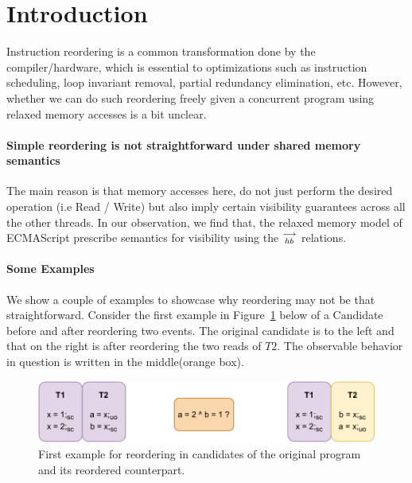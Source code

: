 
\section{Introduction}
    Instruction reordering is a common transformation done by the compiler/hardware, which is essential to optimizations such as instruction scheduling, loop invariant removal, partial redundancy elimination, etc. 
    However, whether we can do such reordering freely given a concurrent program using relaxed memory accesses is a bit unclear. 
     
    \paragraph{Simple reordering is not straightforward under shared memory semantics}
    The main reason is that memory accesses here, do not just perform the desired operation (i.e Read / Write) but also imply certain visibility guarantees across all the other threads.  
    In our observation, we find that, the relaxed memory model of ECMAScript prescribe semantics for visibility using the $\stackrel{\longrightarrow}{_{hb}}$ relations. 
    
    \paragraph{Some Examples}
        We show a couple of examples to showcase why reordering may not be that straightforward. 
        Consider the first example in Figure~\ref{reord:example1(a)} below of a Candidate before and after reordering two events.
        The original candidate is to the left and that on the right is after reordering the two reads of $T2$.
        The observable behavior in question is written in the middle(orange box). 
        \begin{figure}[H]
            \centering
            \includegraphics[scale=0.7]{5.InstructionReordering/0.Intro/ReorderingExample1(a).pdf}
            \caption{First example for reordering in candidates of the original program and its reordered counterpart.}
            \label{reord:example1(a)} 
        \end{figure}
        
